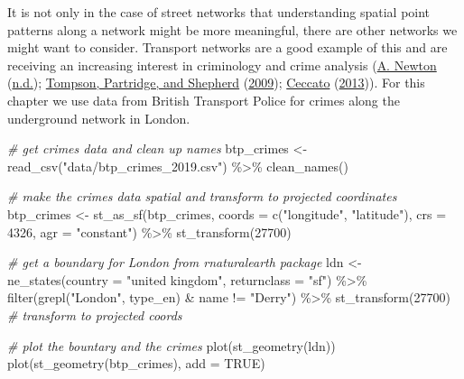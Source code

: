 \documentclass[
  krantz2]{krantz}
\makeatletter
\newenvironment{Shaded}{\begin{snugshade}}{\end{snugshade}}
\newcommand{\AttributeTok}[1]{\textcolor[rgb]{0.61,0.61,0.61}{#1}}
\newcommand{\CommentTok}[1]{\textcolor[rgb]{0.37,0.37,0.37}{\textit{#1}}}
\newcommand{\ConstantTok}[1]{\textcolor[rgb]{0,0,0}{#1}}
\newcommand{\DecValTok}[1]{\textcolor[rgb]{0.06,0.06,0.06}{#1}}
\newcommand{\FunctionTok}[1]{\textcolor[rgb]{0,0,0}{#1}}
\newcommand{\NormalTok}[1]{#1}
\newcommand{\OtherTok}[1]{\textcolor[rgb]{0.37,0.37,0.37}{#1}}
\newcommand{\SpecialCharTok}[1]{\textcolor[rgb]{0,0,0}{#1}}
\newcommand{\StringTok}[1]{\textcolor[rgb]{0.5,0.5,0.5}{#1}}
\newenvironment{kframe}{%
\medskip{}
\setlength{\fboxsep}{.8em}
 \def\at@end@of@kframe{}%
 \ifinner\ifhmode%
  \def\at@end@of@kframe{\end{minipage}}%
  \begin{minipage}{\columnwidth}%
 \fi\fi%
 \def\FrameCommand##1{\hskip\@totalleftmargin \hskip-\fboxsep
 \colorbox{shadecolor}{##1}\hskip-\fboxsep
     \hskip-\linewidth \hskip-\@totalleftmargin \hskip\columnwidth}%
 \MakeFramed {\advance\hsize-\width
   \@totalleftmargin\z@ \linewidth\hsize
   \@setminipage}}%
 {\par\unskip\endMakeFramed%
 \at@end@of@kframe}
\renewenvironment{Shaded}{\begin{kframe}}{\end{kframe}}
\makeatother
\begin{document}
It is not only in the case of street networks that understanding spatial point patterns along a network might be more meaningful, there are other networks we might want to consider. Transport networks are a good example of this and are receiving an increasing interest in criminology and crime analysis (\protect\hyperlink{ref-Newton_2008}{A. Newton} (\protect\hyperlink{ref-Newton_2008}{n.d.}); \protect\hyperlink{ref-Tompson_2009}{Tompson, Partridge, and Shepherd} (\protect\hyperlink{ref-Tompson_2009}{2009}); \protect\hyperlink{ref-Ceccato_2013}{Ceccato} (\protect\hyperlink{ref-Ceccato_2013}{2013})). For this chapter we use data from British Transport Police for crimes along the underground network in London.

\begin{Shaded}
\begin{Highlighting}[]
\CommentTok{\# get crimes data and clean up names}
\NormalTok{btp\_crimes }\OtherTok{\textless{}{-}} \FunctionTok{read\_csv}\NormalTok{(}\StringTok{"data/btp\_crimes\_2019.csv"}\NormalTok{) }\SpecialCharTok{\%\textgreater{}\%} 
  \FunctionTok{clean\_names}\NormalTok{()}

\CommentTok{\# make the crimes data spatial and transform to projected coordinates}
\NormalTok{btp\_crimes }\OtherTok{\textless{}{-}} \FunctionTok{st\_as\_sf}\NormalTok{(btp\_crimes, }
                       \AttributeTok{coords =} \FunctionTok{c}\NormalTok{(}\StringTok{"longitude"}\NormalTok{, }\StringTok{"latitude"}\NormalTok{),}
                       \AttributeTok{crs =} \DecValTok{4326}\NormalTok{, }\AttributeTok{agr =} \StringTok{"constant"}\NormalTok{) }\SpecialCharTok{\%\textgreater{}\%} 
  \FunctionTok{st\_transform}\NormalTok{(}\DecValTok{27700}\NormalTok{)}

\CommentTok{\# get a boundary for London from rnaturalearth package}
\NormalTok{ldn }\OtherTok{\textless{}{-}} \FunctionTok{ne\_states}\NormalTok{(}\AttributeTok{country =} \StringTok{"united kingdom"}\NormalTok{, }
                 \AttributeTok{returnclass =} \StringTok{"sf"}\NormalTok{) }\SpecialCharTok{\%\textgreater{}\%}
  \FunctionTok{filter}\NormalTok{(}\FunctionTok{grepl}\NormalTok{(}\StringTok{"London"}\NormalTok{, type\_en) }\SpecialCharTok{\&}\NormalTok{ name }\SpecialCharTok{!=} \StringTok{"Derry"}\NormalTok{) }\SpecialCharTok{\%\textgreater{}\%} 
  \FunctionTok{st\_transform}\NormalTok{(}\DecValTok{27700}\NormalTok{) }\CommentTok{\# transform to projected coords}

\CommentTok{\# plot the bountary and the crimes}
\FunctionTok{plot}\NormalTok{(}\FunctionTok{st\_geometry}\NormalTok{(ldn))}
\FunctionTok{plot}\NormalTok{(}\FunctionTok{st\_geometry}\NormalTok{(btp\_crimes),  }\AttributeTok{add =} \ConstantTok{TRUE}\NormalTok{)}
\end{Highlighting}
\end{Shaded}
\end{document}
